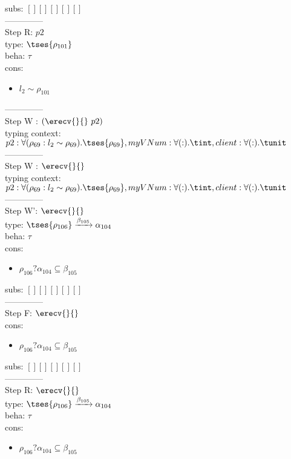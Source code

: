 \documentclass[12pt]{article}
\begin{document}
 subs:  $ [ ] [] [] [] [] $ 
  \\--------------\\ 
Step R: $ p2 $\\
  type: $  \tses{ \rho_{101}} $ 
\\  beha: $ \tau $ 
\\  cons: \begin{itemize}
\item $ l_{2} \sim\rho_{101} $
\end{itemize} 
  --------------\\ 
Step W : $ (\erecv{}{}~p2) $\\
 typing context: $ p2:\forall (\rho_{69} : l_{2} \sim\rho_{69}).  \tses{ \rho_{69}}, myVNum:\forall ( : ). \tint, client:\forall ( : ). \tunit$ 
\\ --------------\\
Step W : $ \erecv{}{} $\\
 typing context: $ p2:\forall (\rho_{69} : l_{2} \sim\rho_{69}).  \tses{ \rho_{69}}, myVNum:\forall ( : ). \tint, client:\forall ( : ). \tunit$ 
\\ --------------\\
Step W': $ \erecv{}{} $\\
  type: $  \tses{ \rho_{106}} \xrightarrow{\beta_{105}} \alpha_{104} $ 
\\  beha: $ \tau $ 
\\  cons: \begin{itemize}
\item $ \rho_{106}?\alpha_{104} \subseteq \beta_{105} $
\end{itemize} 
  subs:  $ [ ] [] [] [] [] $  
 \\--------------\\ 
Step F: $ \erecv{}{} $
 \\ cons: \begin{itemize}
\item $ \rho_{106}?\alpha_{104} \subseteq \beta_{105} $
\end{itemize}
 subs:  $ [ ] [] [] [] [] $ 
  \\--------------\\ 
Step R: $ \erecv{}{} $\\
  type: $  \tses{ \rho_{106}} \xrightarrow{\beta_{105}} \alpha_{104} $ 
\\  beha: $ \tau $ 
\\  cons: \begin{itemize}
\item $ \rho_{106}?\alpha_{104} \subseteq \beta_{105} $
\end{itemize} 
\end{document}
